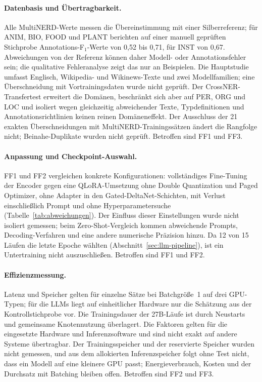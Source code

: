 \paragraph{Datenbasis und Übertragbarkeit.}
Alle MultiNERD-Werte messen die Übereinstimmung mit einer Silberreferenz;
für ANIM, BIO, FOOD und PLANT berichten \textcite{tedeschi2022multinerd}
auf einer manuell geprüften Stichprobe Annotations-F$_1$-Werte von 0{,}52
bis 0{,}71, für INST von 0{,}67.
Abweichungen von der Referenz können daher Modell- oder Annotationsfehler
sein; die qualitative Fehleranalyse zeigt das nur an Beispielen.
Die Hauptstudie umfasst Englisch, Wikipedia- und Wikinews-Texte und zwei
Modellfamilien; eine Überschneidung mit Vortrainingsdaten wurde nicht
geprüft.
Der CrossNER-Transfertest erweitert die Domänen, beschränkt sich aber auf
PER, ORG und LOC und isoliert wegen gleichzeitig abweichender Texte,
Typdefinitionen und Annotationsrichtlinien keinen reinen Domäneneffekt.
Der Ausschluss der 21 exakten Überschneidungen mit
MultiNERD-Trainingssätzen ändert die Rangfolge nicht; Beinahe-Duplikate
wurden nicht geprüft.
Betroffen sind FF1 und FF3.

\paragraph{Anpassung und Checkpoint-Auswahl.}
FF1 und FF2 vergleichen konkrete Konfigurationen: vollständiges
Fine-Tuning der Encoder gegen eine QLoRA-Umsetzung ohne Double
Quantization und Paged Optimizer, ohne Adapter in den
Gated-DeltaNet-Schichten, mit Verlust einschließlich Prompt und ohne
Hyperparametersuche (Tabelle~\ref{tab:abweichungen}).
Der Einfluss dieser Einstellungen wurde nicht isoliert gemessen; beim
Zero-Shot-Vergleich kommen abweichende Prompts, Decoding-Verfahren und
eine andere numerische Präzision hinzu.
Da 12 von 15 Läufen die letzte Epoche wählten
(Abschnitt~\ref{sec:llm-pipeline}), ist ein Untertraining nicht
auszuschließen.
Betroffen sind FF1 und FF2.

\paragraph{Effizienzmessung.}
Latenz und Speicher gelten für einzelne Sätze bei Batchgröße~1 auf drei
GPU-Typen; für die LLMs liegt auf einheitlicher Hardware nur die
Schätzung aus der Kontrollstichprobe vor.
Die Trainingsdauer der 27B-Läufe ist durch Neustarts und
gemeinsame Knotennutzung überlagert.
Die Faktoren gelten für die eingesetzte Hardware und Inferenzsoftware
und sind nicht exakt auf andere Systeme übertragbar.
Der Trainingsspeicher und der reservierte Speicher wurden nicht gemessen,
und aus dem allokierten Inferenzspeicher folgt ohne Test nicht, dass ein
Modell auf eine kleinere GPU passt; Energieverbrauch, Kosten und der Durchsatz mit Batching
bleiben offen.
Betroffen sind FF2 und FF3.

